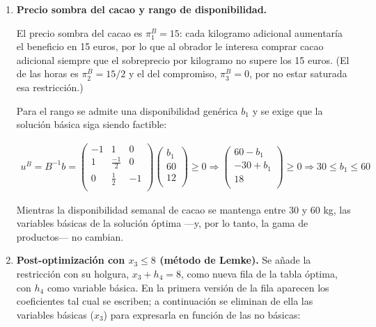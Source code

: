 \begin{enumerate}
\item \textbf{Precio sombra del cacao y rango de disponibilidad.}

El precio sombra del cacao es $\pi^B_1 = 15$: cada kilogramo adicional aumentaría el beneficio en 15 euros, por lo que al obrador le interesa comprar cacao adicional siempre que el sobreprecio por kilogramo no supere los 15 euros. (El de las horas es $\pi^B_2 = 15/2$ y el del compromiso, $\pi^B_3 = 0$, por no estar saturada esa restricción.)

Para el rango se admite una disponibilidad genérica $b_1$ y se exige que la solución básica siga siendo factible:

\begin{equation}
\begin{split}
u^B = B^{-1}b = 
\begin{pmatrix}
-1 & 1 & 0\\
1 & \frac{-1}{2} & 0\\
0 & \frac{1}{2} & -1\\
\end{pmatrix}
\begin{pmatrix}
b_1\\
60\\
12\\
\end{pmatrix}
\geq 0 \Rightarrow
\begin{pmatrix}
60 - b_1\\
-30 + b_1\\
18\\
\end{pmatrix}
\geq 0 \Rightarrow
30 \leq b_1 \leq 60
\end{split}
\end{equation}

Mientras la disponibilidad semanal de cacao se mantenga entre 30 y 60 kg, las variables básicas de la solución óptima —y, por lo tanto, la gama de productos— no cambian.

\item \textbf{Post-optimización con $x_3 \leq 8$ (método de Lemke).} Se añade la restricción con su holgura, $x_3 + h_4 = 8$, como nueva fila de la tabla óptima, con $h_4$ como variable básica. En la primera versión de la fila aparecen los coeficientes tal cual se escriben; a continuación se eliminan de ella las variables básicas ($x_3$) para expresarla en función de las no básicas:


\end{enumerate}
